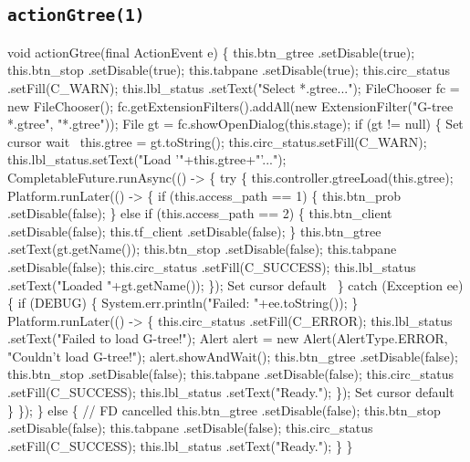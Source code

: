 \subsection{\texttt{actionGtree(1)}}
\nwenddocs{}\endmoddef{}
void actionGtree(final ActionEvent e) \{
  this.btn_gtree    .setDisable(true);
  this.btn_stop     .setDisable(true);
  this.tabpane      .setDisable(true);
  this.circ_status  .setFill(C_WARN);
  this.lbl_status   .setText("Select *.gtree...");
  FileChooser fc = new FileChooser();
  fc.getExtensionFilters().addAll(new ExtensionFilter("G-tree *.gtree", "*.gtree"));
  File gt = fc.showOpenDialog(this.stage);
  if (gt != null) \{
    \LA{}Set cursor wait~{\nwtagstyle{}}\RA{}
    this.gtree = gt.toString();
    this.circ_status.setFill(C_WARN);
    this.lbl_status.setText("Load '"+this.gtree+"'...");
    CompletableFuture.runAsync(() -> \{
      try \{
        this.controller.gtreeLoad(this.gtree);
        Platform.runLater(() -> \{
          if (this.access_path == 1) \{
            this.btn_prob   .setDisable(false);
          \} else if (this.access_path == 2) \{
            this.btn_client .setDisable(false);
            this.tf_client  .setDisable(false);
          \}
          this.btn_gtree    .setText(gt.getName());
          this.btn_stop     .setDisable(false);
          this.tabpane      .setDisable(false);
          this.circ_status  .setFill(C_SUCCESS);
          this.lbl_status   .setText("Loaded "+gt.getName());
        \});
        \LA{}Set cursor default~{\nwtagstyle{}}\RA{}
      \} catch (Exception ee) \{
        if (DEBUG) \{
          System.err.println("Failed: "+ee.toString());
        \}
        Platform.runLater(() -> \{
          this.circ_status  .setFill(C_ERROR);
          this.lbl_status   .setText("Failed to load G-tree!");
          Alert alert = new Alert(AlertType.ERROR, "Couldn't load G-tree!");
          alert.showAndWait();
          this.btn_gtree    .setDisable(false);
          this.btn_stop     .setDisable(false);
          this.tabpane      .setDisable(false);
          this.circ_status  .setFill(C_SUCCESS);
          this.lbl_status   .setText("Ready.");
        \});
        \LA{}Set cursor default~{\nwtagstyle{}}\RA{}
      \}
    \});
  \} else \{
    // FD cancelled
    this.btn_gtree    .setDisable(false);
    this.btn_stop     .setDisable(false);
    this.tabpane      .setDisable(false);
    this.circ_status  .setFill(C_SUCCESS);
    this.lbl_status   .setText("Ready.");
  \}
\}
\eatline
{}\nwendcode{}\nwdocspar

